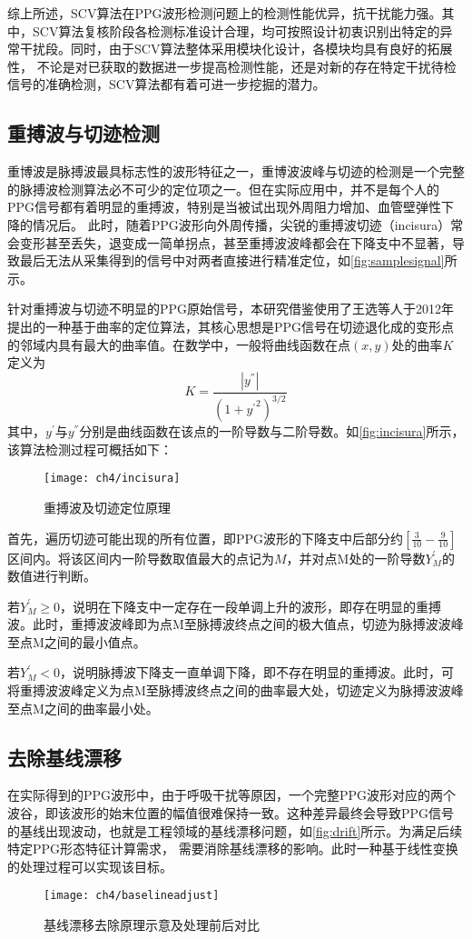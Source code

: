 综上所述，SCV算法在PPG波形检测问题上的检测性能优异，抗干扰能力强。其中，SCV算法复核阶段各检测标准设计合理，均可按照设计初衷识别出特定的异常干扰段。同时，由于SCV算法整体采用模块化设计，各模块均具有良好的拓展性，
不论是对已获取的数据进一步提高检测性能，还是对新的存在特定干扰待检信号的准确检测，SCV算法都有着可进一步挖掘的潜力。

\subsection{重搏波与切迹检测}
重博波是脉搏波最具标志性的波形特征之一，重博波波峰与切迹的检测是一个完整的脉搏波检测算法必不可少的定位项之一\cite{Wang2012}。但在实际应用中，并不是每个人的PPG信号都有着明显的重搏波，特别是当被试出现外周阻力增加、血管壁弹性下降的情况后\cite{mmt}。
此时，随着PPG波形向外周传播，尖锐的重搏波切迹（incisura）常会变形甚至丢失，退变成一简单拐点，甚至重搏波波峰都会在下降支中不显著，导致最后无法从采集得到的信号中对两者直接进行精准定位，如\autoref{fig:samplesignal}所示。

针对重搏波与切迹不明显的PPG原始信号，本研究借鉴使用了王选等人于2012年提出的一种基于曲率的定位算法\cite{Wang2012}，其核心思想是PPG信号在切迹退化成的变形点的邻域内具有最大的曲率值。在数学中，一般将曲线函数在点$(x,y)$处的曲率$K$定义为
\begin{equation}
    \label{equ:curvature}
    K=\frac{|y^{''}|}{{(1+{y^{'}}^2)}^{3/2}}
\end{equation}
其中，$y^{'}$与$y^{''}$分别是曲线函数在该点的一阶导数与二阶导数。如\autoref{fig:incisura}所示，该算法检测过程可概括如下：
\begin{figure}[htbp]
    \centering
    \texttt{[image: ch4/incisura]}
    \caption{\label{fig:incisura}重搏波及切迹定位原理}
\end{figure}

首先，遍历切迹可能出现的所有位置，即PPG波形的下降支中后部分约$[\frac{3}{10}-\frac{9}{10}]$区间内。将该区间内一阶导数取值最大的点记为$M$，并对点M处的一阶导数$Y_M^{'}$的数值进行判断。

若$Y_M^{'}\ge 0$，说明在下降支中一定存在一段单调上升的波形，即存在明显的重搏波。此时，重搏波波峰即为点M至脉搏波终点之间的极大值点，切迹为脉搏波波峰至点M之间的最小值点。

若$Y_M^{'}<0$，说明脉搏波下降支一直单调下降，即不存在明显的重搏波。此时，可将重搏波波峰定义为点M至脉搏波终点之间的曲率最大处，切迹定义为脉搏波波峰至点M之间的曲率最小处。
\subsection{去除基线漂移}
在实际得到的PPG波形中，由于呼吸干扰等原因，一个完整PPG波形对应的两个波谷，即该波形的始末位置的幅值很难保持一致。这种差异最终会导致PPG信号的基线出现波动，也就是工程领域的基线漂移问题，如\autoref{fig:drift}所示。为满足后续特定PPG形态特征计算需求，
需要消除基线漂移的影响。此时一种基于线性变换的处理过程可以实现该目标。
\begin{figure}[htbp]
    \centering
    \texttt{[image: ch4/baselineadjust]}
    \caption{\label{fig:drift}基线漂移去除原理示意及处理前后对比}
\end{figure}

